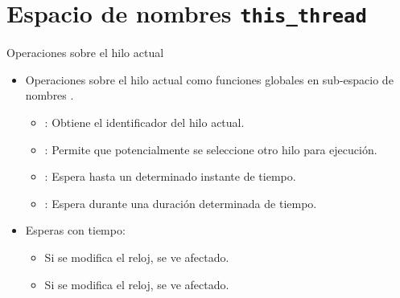 \section{Espacio de nombres \texttt{this\_thread}}

\begin{frame}[t]{Operaciones sobre el hilo actual}
\begin{itemize}
  \item Operaciones sobre el hilo actual como funciones globales en 
        sub-espacio de nombres .
    \begin{itemize}
      \item {}: Obtiene el identificador del hilo actual.
      \item {}: Permite que potencialmente se seleccione otro hilo para ejecución.
      \item {}: Espera hasta un determinado instante de tiempo.
      \item {}: Espera durante una duración determinada de tiempo.
    \end{itemize}

  \item Esperas con tiempo:
    \begin{itemize}
      \item Si se modifica el reloj,  se ve afectado.
      \item Si se modifica el reloj,   se ve afectado.
    \end{itemize}
\end{itemize}
\end{frame}

